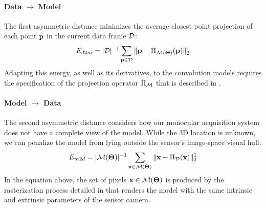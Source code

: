 \paragraph{Data $\rightarrow$ Model}
The first asymmetric distance minimizes the average closest point projection of each point $\mathbf{p}$ in the current data frame $\mathcal{D}$:
%
\begin{equation}
E_{d2m} = |\mathcal{D}|^{-1} \sum_{\mathbf{p} \in \mathcal{D}} \| \mathbf{p} - \Pi_{\mathcal{M}(\boldsymbol{\Theta})}(\mathbf{p})\|_2^1
\label{eq:d2m}
\end{equation}
% 
Adapting this energy, as well as its derivatives, to the convolution models requires the specification of the projection operator $\Pi_{\mathcal{M}}$ that is described in .

\paragraph{Model $\rightarrow$ Data}
The second asymmetric distance considers how our monocular acquisition system does not have a complete view of the model. While the 3D location is unknown, we can penalize the model from lying outside the sensor's image-space visual hull:
\begin{equation}
E_{m2d} = |\mathcal{M}(\boldsymbol{\Theta})|^{-1} \sum_{\mathbf{x} \in \mathcal{M}(\boldsymbol{\Theta})} \| \mathbf{x} - \Pi_{\mathcal{D}}(\mathbf{x})\|_2^1
\label{eq:m2d}
\end{equation}
In the equation above, the set of pixels $\mathbf{x} \in \mathcal{M}(\boldsymbol{\Theta})$ is produced by the rasterization process detailed in  that renders the model with the same intrinsic and extrinsic parameters of the sensor camera. 

